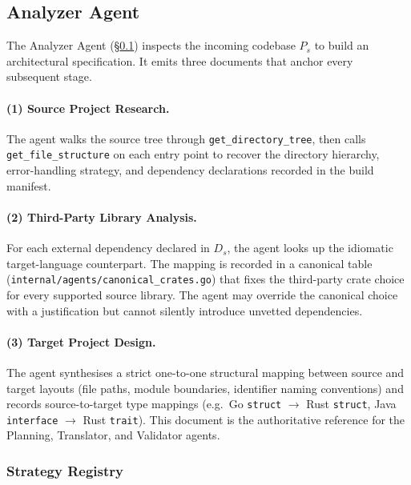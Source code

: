 \subsection{Analyzer Agent}
\label{sec:method_analyzer}

The Analyzer Agent (§\ref{sec:method_analyzer}) inspects the incoming
codebase $P_s$ to build an architectural specification. It emits three
documents that anchor every subsequent stage.

\paragraph{(1) Source Project Research.}
The agent walks the source tree through \texttt{get\_directory\_tree},
then calls \texttt{get\_file\_structure} on each entry point to recover
the directory hierarchy, error-handling strategy, and dependency
declarations recorded in the build manifest.

\paragraph{(2) Third-Party Library Analysis.}
For each external dependency declared in $D_s$, the agent looks up the
idiomatic target-language counterpart. The mapping is recorded in a
canonical table (\texttt{internal/agents/canonical\_crates.go}) that
fixes the third-party crate choice for every supported source library.
The agent may override the canonical choice with a justification but
cannot silently introduce unvetted dependencies.

\paragraph{(3) Target Project Design.}
The agent synthesises a strict one-to-one structural mapping between
source and target layouts (file paths, module boundaries, identifier
naming conventions) and records source-to-target type mappings (e.g.\ Go
\texttt{struct} $\to$ Rust \texttt{struct}, Java \texttt{interface}
$\to$ Rust \texttt{trait}). This document is the authoritative reference
for the Planning, Translator, and Validator agents.

\subsubsection{Strategy Registry}
\label{sec:method_strategies}

